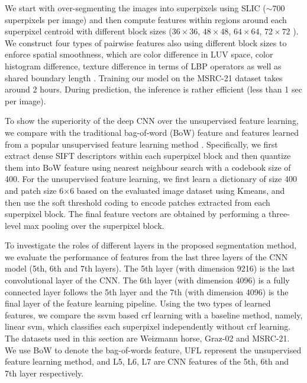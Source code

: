 \documentclass[10pt,3p]{elsarticle}
\newcommand{\ssvm}{{\sc ssvm}\xspace}
\newcommand{\svm}{{\sc svm}\xspace}
\newcommand{\crf}{{\sc crf}\xspace}
\begin{document}
We start with over-segmenting the images into superpixels using SLIC \cite{slic} ($\sim 700$ superpixels per image) and then compute features  within regions around each superpixel centroid with different block sizes ($36 \times 36$, $48 \times 48$, $64 \times 64$, $72 \times 72$ ). 
We construct four types of pairwise features also using different block sizes to enforce spatial smoothness, which are color difference in LUV space, color histogram difference, texture difference in terms of LBP operators as well as shared boundary length \cite{Fulkerson09}. 
Training our model on the MSRC-21 dataset takes around 2 hours.
During prediction, the inference is rather efficient (less than 1 sec per image).

To show the superiority of the deep CNN over the unsupervised feature learning, we compare with the traditional bag-of-word (BoW) feature and features learned from a popular unsupervised feature learning method \cite{Coates11}. Specifically, we first extract dense SIFT descriptors within each superpixel block and then quantize them into BoW feature using nearest neighbour search with a codebook size of 400. 
For the unsupervised feature learning, we first learn a dictionary of size 400 and patch size 6$\times$6 based on the evaluated image dataset using Kmeans, and then use the soft threshold coding \cite{Coates11}%
to encode patches extracted from each superpixel block. The final feature vectors are obtained by performing a three-level max pooling over the superpixel block. 

To investigate the roles of different layers in the proposed segmentation method, we evaluate the performance of features from the last three layers of the CNN model (5th, 6th and 7th layers). The 5th layer (with dimension 9216) is the last convolutional layer of the CNN. 
The 6th layer (with dimension 4096) is a fully connected layer follows the 5th layer and the 7th (with dimension 4096) is the final layer of the feature learning pipeline.
Using the two types of learned features, we compare the \ssvm based \crf learning with a baseline method, namely, linear \svm, which classifies each superpixel independently without \crf learning.
The datasets used in this section are Weizmann horse, Graz-02 and MSRC-21.
We use BoW to denote the bag-of-words feature, UFL represent the unsupervised feature learning method, and L5, L6, L7 are CNN features of the 5th, 6th and 7th layer respectively.
\end{document}
